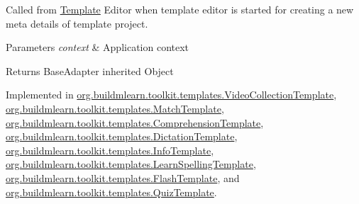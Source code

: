 Called from \hyperlink{enumorg_1_1buildmlearn_1_1toolkit_1_1model_1_1Template}{Template} Editor when template editor is started for creating a new meta details of template project. 


\begin{DoxyParams}{Parameters}
{\em context} & Application context \\
\hline
\end{DoxyParams}
\begin{DoxyReturn}{Returns}
Base\+Adapter inherited Object 
\end{DoxyReturn}


Implemented in \hyperlink{classorg_1_1buildmlearn_1_1toolkit_1_1templates_1_1VideoCollectionTemplate_a095228ca6c37e78c4344ae3d45536dfd}{org.\+buildmlearn.\+toolkit.\+templates.\+Video\+Collection\+Template}, \hyperlink{classorg_1_1buildmlearn_1_1toolkit_1_1templates_1_1MatchTemplate_a9a07a4fd12dc758e34148262d809df82}{org.\+buildmlearn.\+toolkit.\+templates.\+Match\+Template}, \hyperlink{classorg_1_1buildmlearn_1_1toolkit_1_1templates_1_1ComprehensionTemplate_a28470e1c3c390e13d6d19d938709c4d3}{org.\+buildmlearn.\+toolkit.\+templates.\+Comprehension\+Template}, \hyperlink{classorg_1_1buildmlearn_1_1toolkit_1_1templates_1_1DictationTemplate_acc7b175f92340d0f974e4aad90836e6c}{org.\+buildmlearn.\+toolkit.\+templates.\+Dictation\+Template}, \hyperlink{classorg_1_1buildmlearn_1_1toolkit_1_1templates_1_1InfoTemplate_a68a769083399e3718f7c596eb7ebb9b3}{org.\+buildmlearn.\+toolkit.\+templates.\+Info\+Template}, \hyperlink{classorg_1_1buildmlearn_1_1toolkit_1_1templates_1_1LearnSpellingTemplate_ad0d219aa413e781c88283c06bc607214}{org.\+buildmlearn.\+toolkit.\+templates.\+Learn\+Spelling\+Template}, \hyperlink{classorg_1_1buildmlearn_1_1toolkit_1_1templates_1_1FlashTemplate_acc09bbe7a90180bee49dfe4092f8cb29}{org.\+buildmlearn.\+toolkit.\+templates.\+Flash\+Template}, and \hyperlink{classorg_1_1buildmlearn_1_1toolkit_1_1templates_1_1QuizTemplate_aee4a8c4bf17f33d9dd362e3160b67975}{org.\+buildmlearn.\+toolkit.\+templates.\+Quiz\+Template}.


